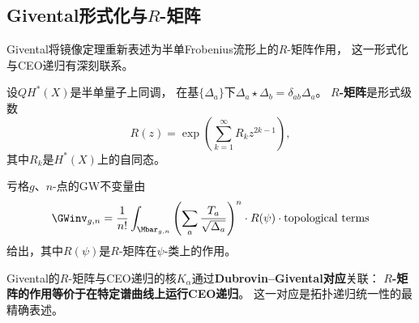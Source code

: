 \subsection{Givental形式化与$R$-矩阵}

Givental将镜像定理重新表述为半单Frobenius流形上的$R$-矩阵作用，
这一形式化与CEO递归有深刻联系。

\begin{definition}[Givental $R$-矩阵]\label{def:rmatrix}
设$QH^*(X)$是半单量子上同调，
在基$\{\Delta_a\}$下$\Delta_a \star \Delta_b = \delta_{ab} \Delta_a$。
\textbf{$R$-矩阵}是形式级数
\begin{equation}\label{eq:rmatrix}
R(z) = \exp\left( \sum_{k=1}^\infty R_k z^{2k-1} \right),
\end{equation}
其中$R_k$是$H^*(X)$上的自同态。
\end{definition}

\begin{theorem}[Givental重建定理]\label{thm:givental}
亏格$g$、$n$-点的GW不变量由
\[
\GWinv_{g,n} = \frac{1}{n!} \int_{\Mbar_{g,n}}
\left( \sum_a \frac{T_a}{\sqrt{\Delta_a}} \right)^n
\cdot R(\psi) \cdot \text{topological terms}
\]
给出，其中$R(\psi)$是$R$-矩阵在$\psi$-类上的作用。
\end{theorem}

Givental的$R$-矩阵与CEO递归的核$K_\alpha$通过\textbf{Dubrovin--Givental对应}关联：
\textbf{$R$-矩阵的作用等价于在特定谱曲线上运行CEO递归}。
这一对应是拓扑递归统一性的最精确表述。
